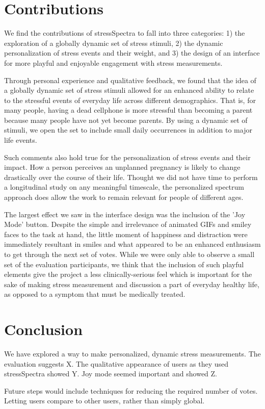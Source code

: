 \documentclass{sigchi}
\begin{document}
\section{Contributions}
We find the contributions of stressSpectra to fall into three categories: 1) the exploration of a globally dynamic set of stress stimuli, 2) the dynamic personalization of stress events and their weight, and 3) the design of an interface for more playful and enjoyable engagement with stress measurements.

Through personal experience and qualitative feedback, we found that the idea of a globally dynamic set of stress stimuli allowed for an enhanced ability to relate to the stressful events of everyday life across different demographics. That is, for many people, having a dead cellphone is more stressful than becoming a parent because many people have not yet become parents. By using a dynamic set of stimuli, we open the set to include small daily occurrences in addition to major life events. 

Such comments also hold true for the personalization of stress events and their impact. How a person perceives an unplanned pregnancy is likely to change drastically over the course of their life. Thought we did not have time to perform a longitudinal study on any meaningful timescale, the personalized spectrum approach does allow the work to remain relevant for people of different ages. 

The largest effect we saw in the interface design was the inclusion of the 'Joy Mode' button. Despite the simple and irrelevance of animated GIFs and smiley faces to the task at hand, the little moment of happiness and distraction were immediately resultant in smiles and what appeared to be an enhanced enthusiasm to get through the next set of votes. While we were only able to observe a small set of the evaluation participants, we think that the inclusion of such playful elements give the project a less clinically-serious feel which is important for the sake of making stress measurement and discussion a part of everyday healthy life, as opposed to a symptom that must be medically treated. 

\section{Conclusion}
We have explored a way to make personalized, dynamic stress measurements. The evaluation suggests X. The qualitative appearance of users as they used stressSpectra showed Y. Joy mode seemed important and showed Z.


Future steps would include techniques for reducing the required number of votes. Letting users compare to other users, rather than simply global. 



\balance




\end{document}
